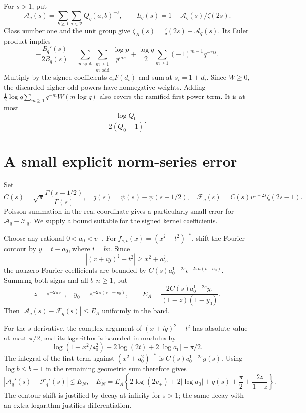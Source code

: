 \documentclass[11pt]{article}
\newcommand{\Z}{\mathbb Z}
\begin{document}
For \(s>1\), put
\[
 \mathcal A_q(s)=\sum_{b\ge1}\sum_{a\in\Z}Q_q(a,b)^{-s},\qquad
 B_q(s)=1+\mathcal A_q(s)/\zeta(2s).
\]
Class number one and the unit group give
\(\zeta_K(s)=\zeta(2s)+\mathcal A_q(s)\). Its Euler product implies
\[
 -\frac{B_q'(s)}{2B_q(s)}
 =\sum_{p\text{ split}}\sum_{\substack{m\ge1\\m\text{ odd}}}
      \frac{\log p}{p^{ms}}
 +\frac{\log q}{2}\sum_{m\ge1}(-1)^{m-1}q^{-ms}.
\]
Multiply by the signed coefficients \(c_iF(d_i)\) and sum at
\(s_i=1+d_i\). Since \(W\ge0\), the discarded higher odd powers
have nonnegative weights. Adding
\(\frac12\log q\sum_{m\ge1}q^{-m}W(m\log q)\) also covers the
ramified first-power term. It is at most
\begin{equation}\label{ramerror}
 \frac{\log Q_0}{2(Q_0-1)}.
\end{equation}

\section{A small explicit norm-series error}\label{poisson}
Set
\[
 C(s)=\sqrt\pi\frac{\Gamma(s-1/2)}{\Gamma(s)},\quad
 g(s)=\psi(s)-\psi(s-1/2),\quad
 \mathcal F_q(s)=C(s)v^{1-2s}\zeta(2s-1).
\]
Poisson summation in the real coordinate gives a particularly small
error for \(\mathcal A_q-\mathcal F_q\). We supply a bound suitable
for the signed kernel coefficients.

Choose any rational \(0<a_0<v_-\). For
\(f_{s,t}(x)=(x^2+t^2)^{-s}\), shift the Fourier contour by
\(y=t-a_0\), where \(t=bv\). Since
\[
 |(x+iy)^2+t^2|\ge x^2+a_0^2,
\]
the nonzero Fourier coefficients are bounded by
\(C(s)a_0^{1-2s}e^{-2\pi n(t-a_0)}\). Summing both signs and
all \(b,n\ge1\), put
\[
 z=e^{-2\pi v_-},\quad y_0=e^{-2\pi(v_--a_0)},\qquad
 E_A=\frac{2C(s)a_0^{1-2s}y_0}{(1-z)(1-y_0)}.
\]
Then \(|\mathcal A_q(s)-\mathcal F_q(s)|\le E_A\) uniformly in
the band.

For the \(s\)-derivative, the complex argument of
\((x+iy)^2+t^2\) has absolute value at most \(\pi/2\), and its
logarithm is bounded in modulus by
\[
 \log(1+x^2/a_0^2)+2\log(2t)+2|\log a_0|+\pi/2.
\]
The integral of the first term against
\((x^2+a_0^2)^{-s}\) is
\(C(s)a_0^{1-2s}g(s)\). Using \(\log b\le b-1\) in the remaining
geometric sum therefore gives
\begin{equation}\label{EN}
 |\mathcal A_q'(s)-\mathcal F_q'(s)|\le E_N,
 \quad E_N=E_A\left\{2\log(2v_+)+2|\log a_0|+g(s)+\frac\pi2
                                      +\frac{2z}{1-z}\right\}.
\end{equation}
The contour shift is justified by decay at infinity for \(s>1\);
the same decay with an extra logarithm justifies differentiation.
\end{document}

